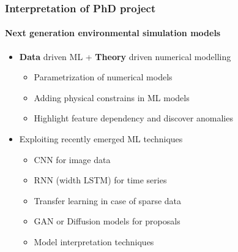 \documentclass[
	10pt, %
]{beamer}
\begin{document}
\begin{frame}
	\frametitle{Interpretation of PhD project}
	\framesubtitle{Next generation environmental simulation models}

	\begin{itemize}
		\item \textbf{Data} driven ML + \textbf{Theory} driven numerical modelling
		\begin{itemize}
			\item Parametrization of numerical models
			\item Adding physical constrains in ML models
			\item Highlight feature dependency and discover anomalies
		\end{itemize}
		
		
		\item Exploiting recently emerged ML techniques
		\begin{itemize}
			\item CNN for image data
			\item RNN (width LSTM) for time series
			\item Transfer learning in case of sparse data
			\item GAN or Diffusion models for proposals 
			\item Model interpretation techniques
		\end{itemize}
	\end{itemize}
	

\end{frame}
\end{document}
